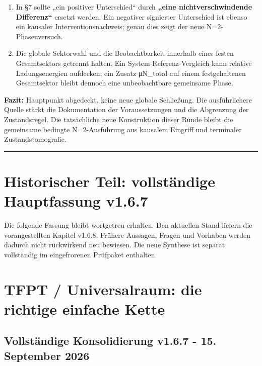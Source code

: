 \begin{enumerate}
\def\labelenumi{\arabic{enumi}.}
\tightlist
\item
  In §7 sollte „ein positiver Unterschied`` durch \textbf{„eine
  nichtverschwindende Differenz``} ersetzt werden. Ein negativer
  signierter Unterschied ist ebenso ein kausaler Interventionsnachweis;
  genau dies zeigt der neue N=2-Phasenversuch.
\item
  Die globale Sektorwahl und die Beobachtbarkeit innerhalb eines festen
  Gesamtsektors getrennt halten. Ein System-Referenz-Vergleich kann
  relative Ladungsenergien aufdecken; ein Zusatz μN\_total auf einem
  festgehaltenen Gesamtsektor bleibt dennoch eine unbeobachtbare
  gemeinsame Phase.
\end{enumerate}

\textbf{Fazit:} Hauptpunkt abgedeckt, keine neue globale Schließung. Die
ausführlichere Quelle stärkt die Dokumentation der Voraussetzungen und
die Abgrenzung der Zustandsregel. Die tatsächliche neue Konstruktion
dieser Runde bleibt die gemeinsame bedingte N=2-Ausführung aus kausalem
Eingriff und terminaler Zustandstomografie.

\begin{center}\rule{0.5\linewidth}{0.5pt}\end{center}

\section{Historischer Teil: vollständige Hauptfassung
v1.6.7}\label{historischer-teil-vollstuxe4ndige-hauptfassung-v1.6.7}

Die folgende Fassung bleibt wortgetreu erhalten. Den aktuellen Stand
liefern die vorangestellten Kapitel v1.6.8. Frühere Aussagen, Fragen und
Vorhaben werden dadurch nicht rückwirkend neu bewiesen. Die neue
Synthese ist separat vollständig im eingefrorenen Prüfpaket enthalten.

\section{TFPT / Universalraum: die richtige einfache
Kette}\label{tfpt-universalraum-die-richtige-einfache-kette}

\subsection{Vollständige Konsolidierung v1.6.7 - 15. September
2026}\label{vollstuxe4ndige-konsolidierung-v1.6.7---15.-september-2026}

